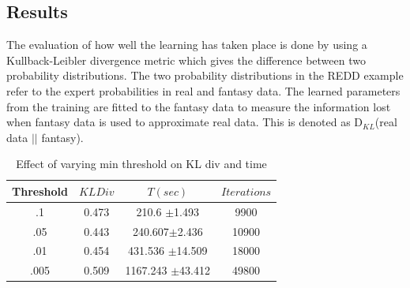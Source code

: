 \documentclass[10pt, conference, compsocconf]{IEEEtran}
\begin{document}
\subsection{Results}
The evaluation of how well the learning has taken place is done by using a Kullback-Leibler divergence metric which gives the difference between two probability distributions. The two probability distributions in the REDD example refer to the expert probabilities in real and fantasy data. The learned parameters from the training are fitted to the fantasy data to measure the information lost when fantasy data is used to approximate real data. This is denoted as D$_{KL}$(real data $|$$|$ fantasy).

\begin{table}[htdp]
\begin{center}
\begin{tabular}{| c | c | c | c |}
\hline
Threshold & $KL Div$ & $T(sec)$ & $Iterations$ \\
\hline
.1 & 0.473 & 210.6 $\pm$1.493 & 9900 \\
.05 & 0.443 & 240.607$\pm$2.436 & 10900 \\
.01 & 0.454 & 431.536 $\pm$14.509 & 18000 \\
.005 & 0.509 & 1167.243 $\pm$43.412 & 49800 \\
\hline
\end{tabular}
\end{center}
\caption{Effect of varying min threshold on KL div and time}
\label{table: error}
\end{table}
\end{document}
